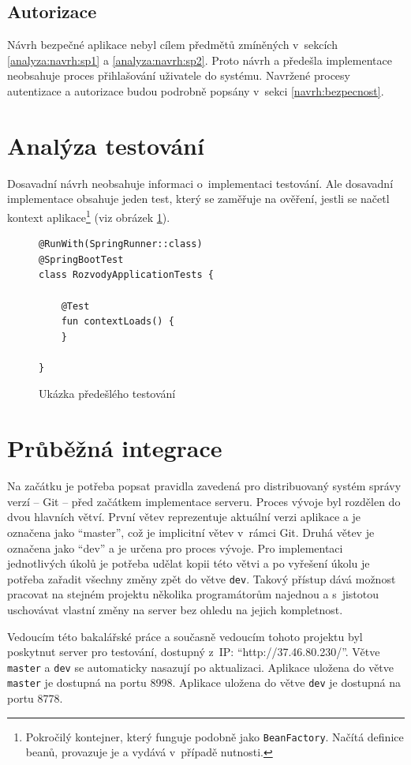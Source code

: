     \subsection{Autorizace}
        Návrh bezpečné aplikace nebyl cílem předmětů zmíněných v~sekcích \ref{analyza:navrh:sp1} a \ref{analyza:navrh:sp2}. Proto návrh a předešla implementace neobsahuje proces přihlašování uživatele do systému. Navržené procesy autentizace a autorizace budou podrobně popsány v~sekci \ref{navrh:bezpecnost}.
        
\section{Analýza testování}\label{analyza:testovani}
    Dosavadní návrh neobsahuje informaci o~implementaci testování. Ale dosavadní implementace obsahuje jeden test, který se zaměřuje na ověření, jestli se načetl {kontext aplikace}\footnote{Pokročilý kontejner, který funguje podobně jako \texttt{BeanFactory}. Načítá definice beanů, provazuje je a vydává v~případě nutnosti.} (viz obrázek \ref{code:test-context-loads1}).
    \begin{figure}
    \begin{verbatim}
@RunWith(SpringRunner::class)
@SpringBootTest
class RozvodyApplicationTests {

    @Test
    fun contextLoads() {
    }

}
        \end{verbatim}
        \caption{Ukázka předešlého testování} 
        \label{code:test-context-loads1}
        \end{figure}
        
\section{Průběžná integrace}\label{analyza:ci}
    Na začátku je potřeba popsat pravidla zavedená pro distribuovaný systém správy verzí -- Git -- před začátkem implementace serveru. Proces vývoje byl rozdělen do dvou hlavních větví. První větev reprezentuje aktuální verzi aplikace a je označena jako \enquote{master}, což je implicitní větev v~rámci Git. Druhá větev je označena jako \enquote{dev} a je určena pro proces vývoje. Pro implementaci jednotlivých úkolů je potřeba udělat kopii této větvi a po vyřešení úkolu je potřeba zařadit všechny změny zpět do větve \verb|dev|. Takový přístup dává možnost pracovat na stejném projektu několika programátorům najednou a s~jistotou uschovávat vlastní změny na server bez ohledu na jejich kompletnost.
    
    Vedoucím této bakalářské práce a současně vedoucím tohoto projektu byl poskytnut server pro testování, dostupný z~IP: \enquote{http://37.46.80.230/}. Větve \verb|master| a \verb|dev| se automaticky nasazují po aktualizaci. Aplikace uložena do větve \verb|master| je dostupná na portu 8998. Aplikace uložena do větve \verb|dev| je dostupná na portu 8778.